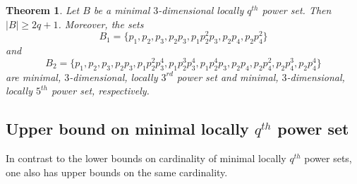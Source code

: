 \documentclass[12pt]{amsart}
\newtheorem{theorem}{Theorem}[section]
\begin{document}
\begin{theorem}
Let $B$ be a minimal $3$-dimensional locally $q^{th}$ power set. Then $\lvert B \rvert \geq 2q+1$. Moreover, the sets 
\[
B_1=\{p_1,p_2,p_3,p_2p_3,p_1p_2^2p_3,p_2p_4,p_2p_4^2\}
\] and
\[
B_2=\{p_1,p_2,p_3,p_2p_3,p_1p_2^2p_3^4,p_1p_2^3p_3^4,p_1p_2^4p_3,p_2p_4,p_2p_4^2,p_2p_4^3,p_2p_4^4\}
\]
are minimal, $3$-dimensional, locally $3^{rd}$ power set and minimal, $3$-dimensional, locally $5^{th}$ power set, respectively.
\end{theorem}

\subsection{Upper bound on minimal locally $q^{th}$ power set}
In contrast to the lower bounds on cardinality of minimal locally $q^{th}$ power sets, one also has upper bounds on the same cardinality.
\end{document}
